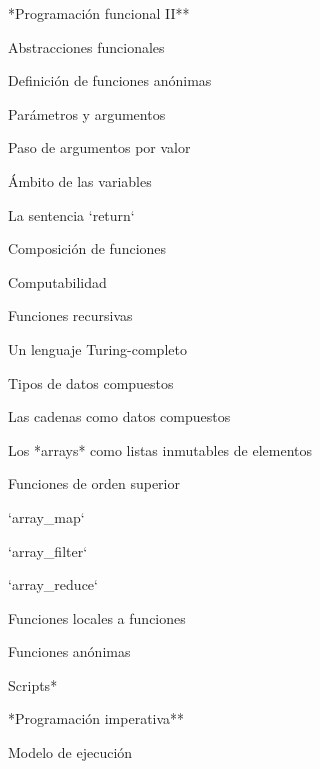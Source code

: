 \begin{longenum}
    \item **Programación funcional II**
    \begin{longenum}
        \item Abstracciones funcionales
        \begin{longenum}
            \item Definición de funciones anónimas
            \item Parámetros y argumentos
            \item Paso de argumentos por valor
            \item Ámbito de las variables
            \item La sentencia `return`
        \end{longenum}
        \item Composición de funciones
        \item Computabilidad
        \begin{longenum}
            \item Funciones recursivas
            \item Un lenguaje Turing-completo
        \end{longenum}
        \item Tipos de datos compuestos
        \begin{longenum}
            \item Las cadenas como datos compuestos
            \item Los *arrays* como listas inmutables de elementos
        \end{longenum}
        \item Funciones de orden superior
        \begin{longenum}
            \item `array_map`
            \item `array_filter`
            \item `array_reduce`
            \item Funciones locales a funciones
            \item Funciones anónimas
        \end{longenum}
        \item *Scripts*
    \end{longenum}
    \item **Programación imperativa**
    \begin{longenum}
        \item Modelo de ejecución
        \begin{longenum}

\end{longenum}
\end{longenum}
\end{longenum}
